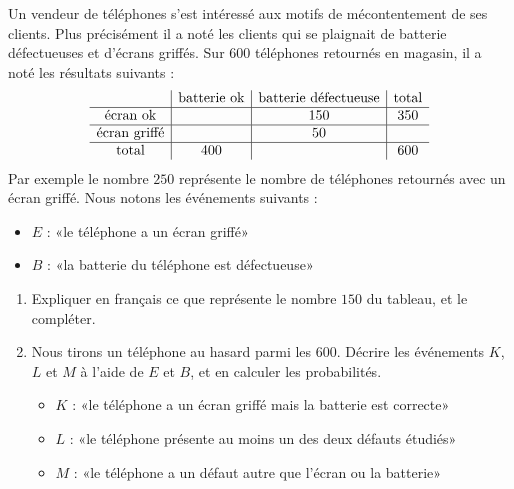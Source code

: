 
\begin{exercice}\label{exosmath-0710}

    Un vendeur de téléphones s'est intéressé aux motifs de mécontentement de ses clients. Plus précisément il a noté les clients qui se plaignait de batterie défectueuses et d'écrans griffés. Sur \( 600\) téléphones retournés en magasin, il a noté les résultats suivants :
    \begin{equation*}
        \begin{array}[]{c|c|c|c}
            &\text{batterie ok}&\text{batterie défectueuse}&\text{total}\\
            \hline
            \text{écran ok}&&150&350\\
            \hline
            \text{écran griffé}&&50&\\
            \hline
            \text{total}&400&&600\\
        \end{array}
    \end{equation*}
    Par exemple le nombre \( 250\) représente le nombre de téléphones retournés avec un écran griffé. Nous notons les événements suivants :
    \begin{itemize}
        \item $E$ : «le téléphone a un écran griffé» 
        \item $B$ : «la batterie du téléphone est défectueuse» 
    \end{itemize}
    \begin{enumerate}
        \item
            Expliquer en français ce que représente le nombre \( 150\) du tableau, et le compléter.
        \item
            Nous tirons un téléphone au hasard parmi les \( 600\). Décrire les événements \( K\), \( L\) et \( M\) à l'aide de \( E\) et \( B\), et en calculer les probabilités.
            \begin{itemize}
                \item \( K\) : «le téléphone a un écran griffé mais la batterie est correcte» 
                \item \( L\) : «le téléphone présente au moins un des deux défauts étudiés» 
                \item \( M\) : «le téléphone a un défaut autre que l'écran ou la batterie» 
            \end{itemize}
    \end{enumerate}

\end{exercice}
